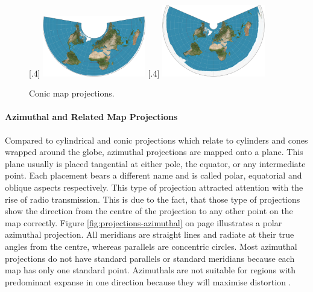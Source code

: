 \begin{figure}[!htb]
    \centering
  [.4\linewidth]
    {
        \includegraphics[width=0.4\textwidth,keepaspectratio]
        {images/methods/projections/albers.jpg}
    }
    \qquad
    [.4\linewidth]
    {
        \includegraphics[width=0.4\textwidth,keepaspectratio]
        {images/methods/projections/equidistant.jpg}
    }

    \caption{Conic map projections.}
\end{figure}

\paragraph{Azimuthal and Related Map Projections}
Compared to cylindrical and conic projections which relate to cylinders and cones wrapped around the globe, azimuthal projections are mapped onto a plane. This plane usually is placed tangential at either pole, the equator, or any intermediate point. Each placement bears a different name and is called polar, equatorial and oblique aspects respectively. This type of projection attracted attention with the rise of radio transmission. This is due to the fact, that those type of projections show the direction from the centre of the projection to any other point on the map correctly. Figure \ref{fig:projections-azimuthal} on page \pageref{fig:projections-azimuthal} illustrates a polar azimuthal projection. All meridians are straight lines and radiate at their true angles from the centre, whereas parallels are concentric circles. Most azimuthal projections do not have standard parallels or standard meridians because each map has only one standard point. Azimuthals are not suitable for regions with predominant expanse in one direction because they will maximise distortion .

